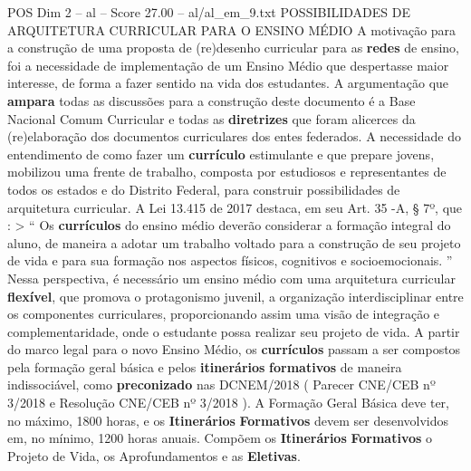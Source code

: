 \begin{textsample}{POS Dim 2 – al – Score 27.00 – al/al\_em\_9.txt}  \label{ex:f2_pos_264}
POSSIBILIDADES DE ARQUITETURA CURRICULAR PARA O ENSINO MÉDIO A motivação para a construção de uma proposta de (re)desenho curricular para as \textbf{redes} de ensino, foi a necessidade de implementação de um Ensino Médio que despertasse maior interesse, de forma a fazer sentido na vida dos estudantes.
A argumentação que \textbf{ampara} todas as discussões para a construção deste documento é a Base Nacional Comum Curricular e todas as \textbf{diretrizes} que foram alicerces da (re)elaboração dos documentos curriculares dos entes federados.
A necessidade do entendimento de como fazer um \textbf{currículo} estimulante e que prepare jovens, mobilizou uma frente de trabalho, composta por estudiosos e representantes de todos os estados e do Distrito Federal, para construir possibilidades de arquitetura curricular.
A Lei 13.415 de 2017 destaca, em seu Art. 35 -A, § 7º, que : > “ Os \textbf{currículos} do ensino médio deverão considerar a formação integral do aluno, de maneira a adotar um trabalho voltado para a construção de seu projeto de vida e para sua formação nos aspectos físicos, cognitivos e socioemocionais. ” Nessa perspectiva, é necessário um ensino médio com uma arquitetura curricular \textbf{flexível}, que promova o protagonismo juvenil, a organização interdisciplinar entre os componentes curriculares, proporcionando assim uma visão de integração e complementaridade, onde o estudante possa realizar seu projeto de vida.
A partir do marco legal para o novo Ensino Médio, os \textbf{currículos} passam a ser compostos pela formação geral básica e pelos \textbf{itinerários} \textbf{formativos} de maneira indissociável, como \textbf{preconizado} nas DCNEM/2018 ( Parecer CNE/CEB nº 3/2018 e Resolução CNE/CEB nº 3/2018 ).
A Formação Geral Básica deve ter, no máximo, 1800 horas, e os \textbf{Itinerários} \textbf{Formativos} devem ser desenvolvidos em, no mínimo, 1200 horas anuais.
Compõem os \textbf{Itinerários} \textbf{Formativos} o Projeto de Vida, os Aprofundamentos e as \textbf{Eletivas}.

\end{textsample}
